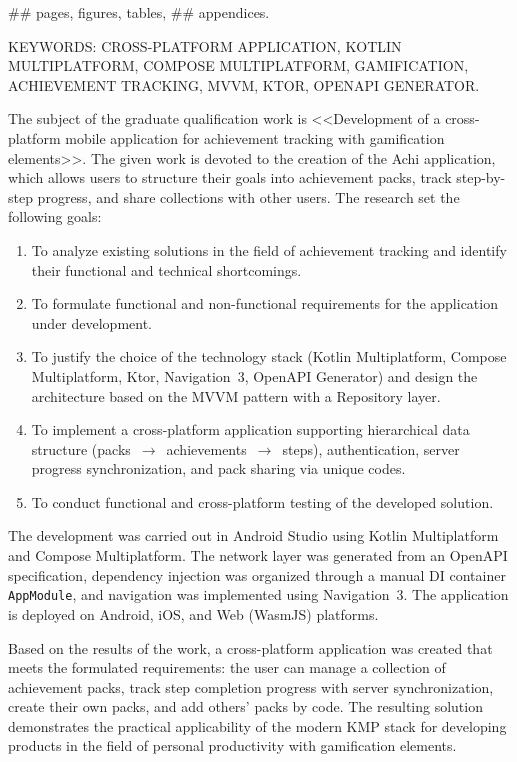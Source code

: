 \documentclass[../main.tex]{subfiles}
\begin{document}
	\thispagestyle{empty}
	
	\noindent
	## pages,  figures,  tables, ## appendices.
	
	KEYWORDS: CROSS-PLATFORM APPLICATION, KOTLIN MULTIPLATFORM, COMPOSE MULTIPLATFORM, GAMIFICATION, ACHIEVEMENT TRACKING, MVVM, KTOR, OPENAPI GENERATOR.
	
	The subject of the graduate qualification work is <<Development of a cross-platform mobile application for achievement tracking with gamification elements>>. The given work is devoted to the creation of the Achi application, which allows users to structure their goals into achievement packs, track step-by-step progress, and share collections with other users.
	The research set the following goals:
	\begin{enumerate}
		\item To analyze existing solutions in the field of achievement tracking and identify their functional and technical shortcomings.
		\item To formulate functional and non-functional requirements for the application under development.
		\item To justify the choice of the technology stack (Kotlin Multiplatform, Compose Multiplatform, Ktor, Navigation~3, OpenAPI Generator) and design the architecture based on the MVVM pattern with a Repository layer.
		\item To implement a cross-platform application supporting hierarchical data structure (packs~$\rightarrow$~achievements~$\rightarrow$~steps), authentication, server progress synchronization, and pack sharing via unique codes.
		\item To conduct functional and cross-platform testing of the developed solution.
	\end{enumerate}
	
	The development was carried out in Android Studio using Kotlin Multiplatform and Compose Multiplatform. The network layer was generated from an OpenAPI specification, dependency injection was organized through a manual DI container \texttt{AppModule}, and navigation was implemented using Navigation~3. The application is deployed on Android, iOS, and Web (WasmJS) platforms.
	
	Based on the results of the work, a cross-platform application was created that meets the formulated requirements: the user can manage a collection of achievement packs, track step completion progress with server synchronization, create their own packs, and add others' packs by code. The resulting solution demonstrates the practical applicability of the modern KMP stack for developing products in the field of personal productivity with gamification elements.
	
	\thispagestyle{empty}
	
\end{document}
